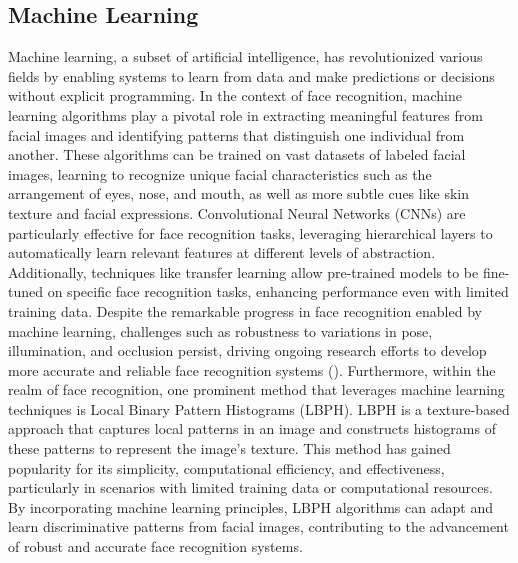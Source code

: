 \documentclass[
]{article}
\begin{document}
\begin{multicols}{2}
\section{Machine Learning}
Machine learning, a subset of artificial intelligence, has revolutionized various fields by enabling systems to learn from data and make predictions or decisions without explicit programming. In the context of face recognition, machine learning algorithms play a pivotal role in extracting meaningful features from facial images and identifying patterns that distinguish one individual from another. These algorithms can be trained on vast datasets of labeled facial images, learning to recognize unique facial characteristics such as the arrangement of eyes, nose, and mouth, as well as more subtle cues like skin texture and facial expressions. Convolutional Neural Networks (CNNs) are particularly effective for face recognition tasks, leveraging hierarchical layers to automatically learn relevant features at different levels of abstraction. Additionally, techniques like transfer learning allow pre-trained models to be fine-tuned on specific face recognition tasks, enhancing performance even with limited training data. Despite the remarkable progress in face recognition enabled by machine learning, challenges such as robustness to variations in pose, illumination, and occlusion persist, driving ongoing research efforts to develop more accurate and reliable face recognition systems (\cite{schwarz2021machine}). Furthermore, within the realm of face recognition, one prominent method that leverages machine learning techniques is Local Binary Pattern Histograms (LBPH). LBPH is a texture-based approach that captures local patterns in an image and constructs histograms of these patterns to represent the image's texture. This method has gained popularity for its simplicity, computational efficiency, and effectiveness, particularly in scenarios with limited training data or computational resources. By incorporating machine learning principles, LBPH algorithms can adapt and learn discriminative patterns from facial images, contributing to the advancement of robust and accurate face recognition systems.


\end{multicols}
\end{document}
